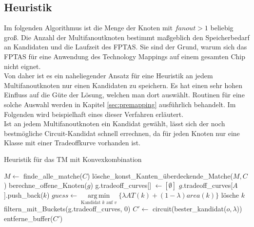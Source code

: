 \documentclass[11pt, a4paper, german]{article}
\DeclareMathOperator*{\argmin}{arg\,min}
\begin{document}
\subsection{Heuristik}
\label{subsec:heuristik}
Im folgenden Algorithmus ist die Menge der Knoten mit $fanout > 1$ beliebig groß.
Die Anzahl der Multifanoutknoten bestimmt maßgeblich den Speicherbedarf an Kandidaten und die Laufzeit des FPTAS. Sie sind der Grund, warum sich das FPTAS für eine Anwendung des Technology Mappings auf einem gesamten Chip nicht eignet. \\
Von daher ist es ein naheliegender Ansatz für eine Heuristik an jedem Multifanoutknoten nur einen Kandidaten zu speichern. Es hat einen sehr hohen Einfluss auf die Güte der Lösung, welchen man dort auswählt. Routinen für eine solche Auswahl werden in Kapitel \ref{sec:premapping} ausführlich behandelt. Im Folgenden wird beispielhaft eines dieser Verfahren erläutert. \\
Ist an jedem Multifanoutknoten ein Kandidat gewählt, lässt sich der noch bestmögliche Circuit-Kandidat schnell errechnen, da für jeden Knoten nur eine Klasse mit einer Tradeoffkurve vorhanden ist.\\

\LinesNumbered
\begin{algorithm}[H]
\DontPrintSemicolon
\caption{Heuristik f\"ur das TM mit Konvexkombination}

   $M \gets$ finde\_alle\_matche($C$)\;
   lösche\_konst\_Kanten\_überdeckende\_Matche($M, C$)\;
        {
			berechne\_offene\_Knoten($g$)\;	 
        }
  {
    g.tradeoff\_curves[] $\gets [\emptyset]$\;
    {
      {
        {
        	 {
			$g$.tradeoff\_curves[$A$].push\_back($k$)\;      	 
        	 }  
        }
      }
    }
  {
    $guess \gets \argmin\limits_{\text{Kandidat }k\text{ auf }v}\{ \lambda AT(k) + (1-\lambda) area(k)  \}$\;
    {
      {
	l\"osche $k$\;
      }
    }
  }    
    filtern\_mit\_Buckets(g.tradeoff\_curves, 0)\;    
  }
  $C' \gets $ circuit(bester\_kandidat($o, \lambda$))\;
  \Return entferne\_buffer($C'$)\;
\end{algorithm}\ \\
\end{document}
